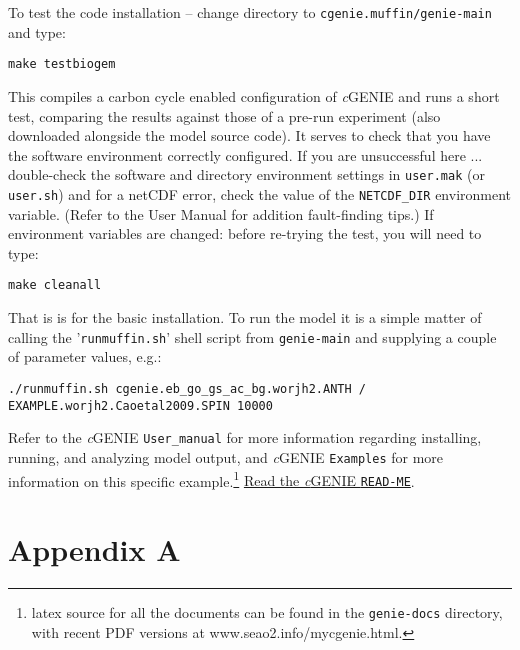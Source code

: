 \documentclass[10pt,twoside]{article}
\begin{document}
\begin{compactenum}
\item To test the code installation -- change directory to \texttt{cgenie.muffin/genie-main} and type:
\vspace{-5pt}\begin{verbatim}
make testbiogem
\end{verbatim}\vspace{-5pt}
This compiles a carbon cycle enabled configuration of \textit{c}GENIE and runs a short test, comparing the results against those of a pre-run experiment (also downloaded alongside the model source code). It serves to check that you have the software environment correctly configured. If you are unsuccessful here ... double-check the software and directory environment settings in \texttt{user.mak} (or \texttt{user.sh}) and for a netCDF error, check the value of the \texttt{NETCDF\_DIR} environment variable. (Refer to the User Manual for addition fault-finding tips.) If environment variables are changed: before re-trying the test, you will need to type:
\vspace{-5pt}\begin{verbatim}
make cleanall
\end{verbatim}\vspace{-5pt}

\end{compactenum}

\noindent That is is for the basic installation. To run the model it is a simple matter of calling the  '\texttt{runmuffin.sh}'  shell script from \texttt{genie-main} and supplying a couple of parameter values, e.g.:
\vspace{-5pt}\small\begin{verbatim}./runmuffin.sh cgenie.eb_go_gs_ac_bg.worjh2.ANTH / EXAMPLE.worjh2.Caoetal2009.SPIN 10000\end{verbatim}\normalsize\vspace{-5pt}
Refer to the \textit{c}GENIE \texttt{User\_manual} for more information regarding installing, running, and analyzing model output, and \textit{c}GENIE \texttt{Examples} for more information on this specific example.\footnote{latex source for all the documents can be found in the \texttt{genie-docs} directory, with recent PDF versions at www.seao2.info/mycgenie.html.} \uline{Read the \textit{c}GENIE \texttt{READ-ME}}.



\newpage
\section*{Appendix A}
\end{document}
